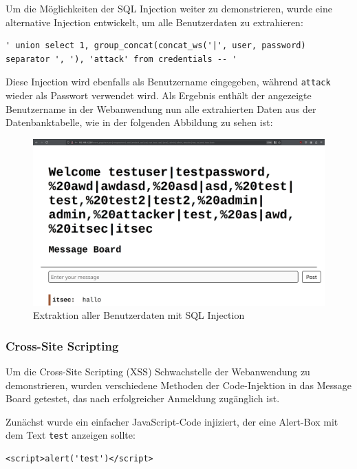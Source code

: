 \documentclass[
    a4paper,
    pagesize,
	pdftex,
    12pt,
]{scrartcl}
\begin{document}
\noindent Um die Möglichkeiten der SQL Injection weiter zu demonstrieren, wurde eine alternative Injection entwickelt, um alle Benutzerdaten zu extrahieren:
\begin{lstlisting}[breaklines]
	' union select 1, group_concat(concat_ws('|', user, password) separator ', '), 'attack' from credentials -- '
\end{lstlisting}
Diese Injection wird ebenfalls als Benutzername eingegeben, während \lstinline|attack| wieder als Passwort verwendet wird. Als Ergebnis enthält der angezeigte Benutzername in der Webanwendung nun alle extrahierten Daten aus der Datenbanktabelle, wie in der folgenden Abbildung zu sehen ist:

\begin{figure}[H]
	\centering
	\includegraphics[width=14cm]{sql-injection-data-extraction.png}
	\caption{Extraktion aller Benutzerdaten mit SQL Injection}
	\label{fig:sql-injection-data-extraction}
\end{figure}

\FloatBarrier

\subsubsection{Cross-Site Scripting}
Um die Cross-Site Scripting (XSS) Schwachstelle der Webanwendung zu demonstrieren, wurden verschiedene Methoden der Code-Injektion in das Message Board getestet, das nach erfolgreicher Anmeldung zugänglich ist.

\noindent Zunächst wurde ein einfacher JavaScript-Code injiziert, der eine Alert-Box mit dem Text \lstinline|test| anzeigen sollte:
\begin{lstlisting}[breaklines]
	<script>alert('test')</script>
\end{lstlisting}
\end{document}
